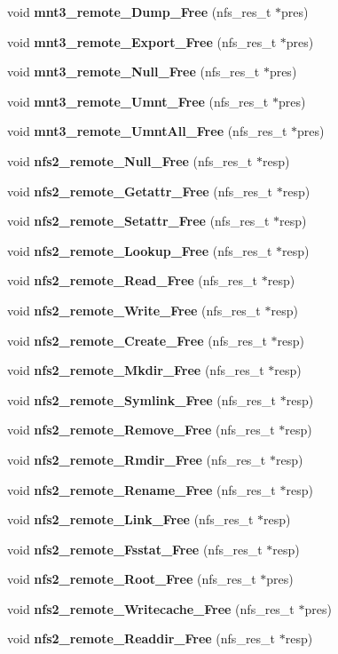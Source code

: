 \begin{CompactItemize}
\item 
void {\bf mnt3\_\-remote\_\-Dump\_\-Free} (nfs\_\-res\_\-t $\ast$pres)
\item 
void {\bf mnt3\_\-remote\_\-Export\_\-Free} (nfs\_\-res\_\-t $\ast$pres)
\item 
void {\bf mnt3\_\-remote\_\-Null\_\-Free} (nfs\_\-res\_\-t $\ast$pres)
\item 
void {\bf mnt3\_\-remote\_\-Umnt\_\-Free} (nfs\_\-res\_\-t $\ast$pres)
\item 
void {\bf mnt3\_\-remote\_\-UmntAll\_\-Free} (nfs\_\-res\_\-t $\ast$pres)
\item 
void {\bf nfs2\_\-remote\_\-Null\_\-Free} (nfs\_\-res\_\-t $\ast$resp)
\item 
void {\bf nfs2\_\-remote\_\-Getattr\_\-Free} (nfs\_\-res\_\-t $\ast$resp)
\item 
void {\bf nfs2\_\-remote\_\-Setattr\_\-Free} (nfs\_\-res\_\-t $\ast$resp)
\item 
void {\bf nfs2\_\-remote\_\-Lookup\_\-Free} (nfs\_\-res\_\-t $\ast$resp)
\item 
void {\bf nfs2\_\-remote\_\-Read\_\-Free} (nfs\_\-res\_\-t $\ast$resp)
\item 
void {\bf nfs2\_\-remote\_\-Write\_\-Free} (nfs\_\-res\_\-t $\ast$resp)
\item 
void {\bf nfs2\_\-remote\_\-Create\_\-Free} (nfs\_\-res\_\-t $\ast$resp)
\item 
void {\bf nfs2\_\-remote\_\-Mkdir\_\-Free} (nfs\_\-res\_\-t $\ast$resp)
\item 
void {\bf nfs2\_\-remote\_\-Symlink\_\-Free} (nfs\_\-res\_\-t $\ast$resp)
\item 
void {\bf nfs2\_\-remote\_\-Remove\_\-Free} (nfs\_\-res\_\-t $\ast$resp)
\item 
void {\bf nfs2\_\-remote\_\-Rmdir\_\-Free} (nfs\_\-res\_\-t $\ast$resp)
\item 
void {\bf nfs2\_\-remote\_\-Rename\_\-Free} (nfs\_\-res\_\-t $\ast$resp)
\item 
void {\bf nfs2\_\-remote\_\-Link\_\-Free} (nfs\_\-res\_\-t $\ast$resp)
\item 
void {\bf nfs2\_\-remote\_\-Fsstat\_\-Free} (nfs\_\-res\_\-t $\ast$resp)
\item 
void {\bf nfs2\_\-remote\_\-Root\_\-Free} (nfs\_\-res\_\-t $\ast$pres)
\item 
void {\bf nfs2\_\-remote\_\-Writecache\_\-Free} (nfs\_\-res\_\-t $\ast$pres)
\item 
void {\bf nfs2\_\-remote\_\-Readdir\_\-Free} (nfs\_\-res\_\-t $\ast$resp)

\end{CompactItemize}
